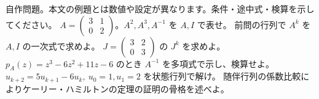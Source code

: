 \documentclass[11pt]{article}
\begin{document}
自作問題。本文の例題とは数値や設定が異なります。条件・途中式・検算を示してください。
\problem[累乗の還元]
$A=\begin{pmatrix}3&1\\0&2\end{pmatrix}$。$A^2,A^3,A^{-1}$ を $A,I$ で表せ。
\workspace{45mm}
\problem[一般の累乗]
前問の行列で $A^k$ を $A,I$ の一次式で求めよ。
\workspace{45mm}
\newpage
\problem[重根の累乗]
$J=\begin{pmatrix}3&2\\0&3\end{pmatrix}$ の $J^k$ を求めよ。
\workspace{45mm}
\problem[3次の逆行列]
$p_A(z)=z^3-6z^2+11z-6$ のとき $A^{-1}$ を多項式で示し、検算せよ。
\workspace{45mm}
\newpage
\problem[数列]
$u_{k+2}=5u_{k+1}-6u_k,\ u_0=1,u_1=2$ を状態行列で解け。
\workspace{45mm}
\problem[一般の場合の証明]
随伴行列の係数比較によりケーリー・ハミルトンの定理の証明の骨格を述べよ。
\workspace{45mm}
\end{document}

